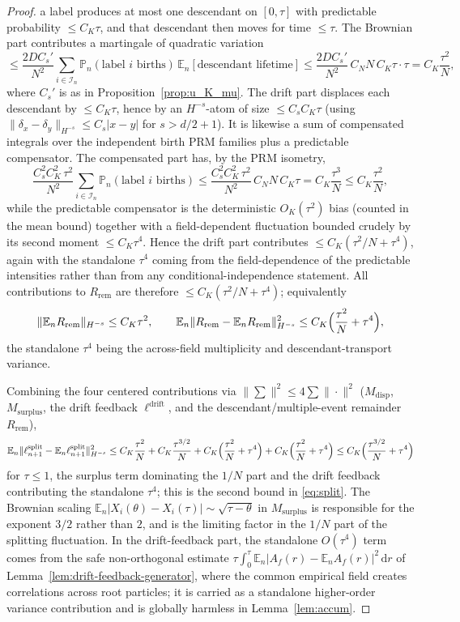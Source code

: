 \documentclass[a4paper,fleqn]{cas-sc}
\theoremstyle{definition}
\theoremstyle{remark}
\begin{document}
\begin{proof}
a label produces at most one descendant on $[0,\tau]$ with predictable probability
$\le C_K\tau$, and that descendant then moves for time $\le\tau$. The Brownian part
contributes a martingale of quadratic variation
\[
\le\frac{2DC_s'}{N^2}\sum_{i\in\mathcal I_n}\mathbb P_n(\text{label }i\text{ births})\,\mathbb E_n[\text{descendant lifetime}]
\le\frac{2DC_s'}{N^2}\,C_NN\,C_K\tau\cdot\tau=C_K\frac{\tau^2}{N},
\]
where $C_s'$ is as in Proposition~\ref{prop:u_K_mu}. The drift
part displaces each descendant by $\le C_K\tau$, hence by an $H^{-s}$-atom of size
$\le C_sC_K\tau$ (using $\|\delta_x-\delta_y\|_{H^{-s}}\le C_s|x-y|$ for $s>d/2+1$). It is
likewise a sum of compensated integrals over the independent birth PRM families plus a
predictable compensator. The compensated part has, by the PRM isometry,
\[
\frac{C_s^2C_K^2\,\tau^2}{N^2}\sum_{i\in\mathcal I_n}\mathbb P_n(\text{label }i\text{ births})
\le\frac{C_s^2C_K^2\,\tau^2}{N^2}\,C_NN\,C_K\tau=C_K\frac{\tau^3}{N}\le C_K\frac{\tau^2}{N},
\]
while the predictable compensator is the deterministic $O_K(\tau^2)$ bias (counted in the
mean bound) together with a field-dependent fluctuation bounded crudely by its second
moment $\le C_K\tau^4$. Hence the drift part contributes $\le C_K(\tau^2/N+\tau^4)$, again
with the standalone $\tau^4$ coming from the field-dependence of the predictable
intensities rather than from any conditional-independence statement. All contributions to
$R_{\mathrm{rem}}$ are therefore $\le C_K(\tau^2/N+\tau^4)$; equivalently
\[
\|\mathbb E_nR_{\mathrm{rem}}\|_{H^{-s}}\le C_K\tau^2,\qquad
\mathbb E_n\|R_{\mathrm{rem}}-\mathbb E_nR_{\mathrm{rem}}\|_{H^{-s}}^2\le C_K\Bigl(\frac{\tau^2}{N}+\tau^4\Bigr),
\]
the standalone $\tau^4$ being the across-field multiplicity and descendant-transport
variance.

Combining the four centered contributions via $\|\sum\|^2\le4\sum\|\cdot\|^2$
($M_{\mathrm{disp}}$, $M_{\mathrm{surplus}}$, the drift feedback $\ell^{\mathrm{drift}}$,
and the descendant/multiple-event remainder $R_{\mathrm{rem}}$),
\[
\mathbb E_n\|\ell^{\mathrm{split}}_{n+1}-\mathbb E_n\ell^{\mathrm{split}}_{n+1}\|_{H^{-s}}^2
\le C_K\frac{\tau^2}{N}+C_K\frac{\tau^{3/2}}{N}+C_K\Bigl(\frac{\tau^2}{N}+\tau^4\Bigr)+C_K\Bigl(\frac{\tau^2}{N}+\tau^4\Bigr)
\le C_K\Bigl(\frac{\tau^{3/2}}{N}+\tau^4\Bigr)
\]
for $\tau\le1$, the surplus term dominating the $1/N$ part and the drift feedback
contributing the standalone $\tau^4$; this is the second bound in
\eqref{eq:split}. The Brownian scaling
$\mathbb E_n|X_i(\theta)-X_i(\tau)|\sim\sqrt{\tau-\theta}$ in
$M_{\mathrm{surplus}}$ is responsible for the exponent $3/2$ rather than $2$, and
is the limiting factor in the $1/N$ part of the splitting fluctuation. In the
drift-feedback part, the standalone $O(\tau^4)$ term comes from the safe
non-orthogonal estimate
$\tau\int_0^\tau\mathbb E_n|A_f(r)-\mathbb E_nA_f(r)|^2\,\mathrm dr$ of
Lemma~\ref{lem:drift-feedback-generator}, where the common empirical field
creates correlations across root particles; it is carried as a standalone
higher-order variance contribution and is globally harmless in
Lemma~\ref{lem:accum}.
\end{proof}
\end{document}
